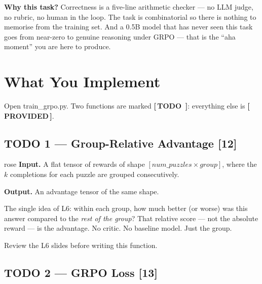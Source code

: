 \documentclass[11pt]{article}
\newcommand{\pts}[1]{{\sans\footnotesize\color{amber}\textbf{[#1]}}}
\newcommand{\provided}{{\sans\footnotesize\color{mint}\textbf{[\,PROVIDED\,]}}}
\newcommand{\todotag}[1]{{\sans\footnotesize\color{rose}\textbf{[\,TODO #1\,]}}}
\newcommand{\codesm}[1]{{\ttfamily\footnotesize #1}}
\begin{document}
\textbf{Why this task?}
Correctness is a five-line arithmetic checker --- no LLM judge, no rubric, no human in the loop.
The task is combinatorial so there is nothing to memorise from the training set.
And a 0.5B model that has never seen this task goes from near-zero to genuine reasoning under GRPO ---
that is the ``aha moment'' you are here to produce.

\section{What You Implement}

Open \codesm{train\_grpo.py}. Two functions are marked \todotag{}: everything else is \provided.

\subsection{TODO 1 --- Group-Relative Advantage \pts{12}}

\begin{qbox}{rose}
\textbf{Input.} A flat tensor of rewards of shape $[\textit{num\_puzzles} \times \textit{group}]$,
where the $k$ completions for each puzzle are grouped consecutively.

\textbf{Output.} An advantage tensor of the same shape.

The single idea of L6: within each group, how much better (or worse) was this answer compared to
the \emph{rest of the group}?
That relative score --- not the absolute reward --- is the advantage.
No critic. No baseline model. Just the group.

Review the L6 slides before writing this function.
\end{qbox}

\subsection{TODO 2 --- GRPO Loss \pts{13}}
\end{document}
